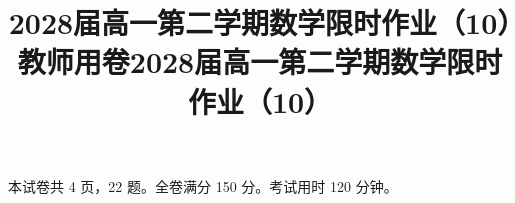 \documentclass{../exam-zh}
\title{2028届高一第二学期数学限时作业（10）教师用卷}
\title{2028届高一第二学期数学限时作业（10）}
\begin{document}
\maketitle


本试卷共 4 页，22 题。全卷满分 150 分。考试用时 120 分钟。






\end{document}
